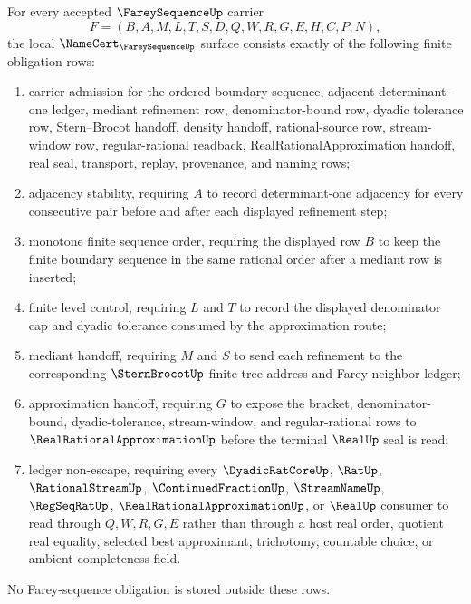 \begin{theorem}
\label{thm:farey-sequence-namecert-obligations}
For every accepted $\FareySequenceUp$ carrier
$$
F=(B,A,M,L,T,S,D,Q,W,R,G,E,H,C,P,N),
$$
the local $\NameCert_{\FareySequenceUp}$ surface consists exactly of the following finite obligation rows:
\begin{enumerate}
\item carrier admission for the ordered boundary sequence, adjacent determinant-one ledger, mediant refinement row, denominator-bound row, dyadic tolerance row, Stern--Brocot handoff, density handoff, rational-source row, stream-window row, regular-rational readback, RealRationalApproximation handoff, real seal, transport, replay, provenance, and naming rows;
\item adjacency stability, requiring $A$ to record determinant-one adjacency for every consecutive pair before and after each displayed refinement step;
\item monotone finite sequence order, requiring the displayed row $B$ to keep the finite boundary sequence in the same rational order after a mediant row is inserted;
\item finite level control, requiring $L$ and $T$ to record the displayed denominator cap and dyadic tolerance consumed by the approximation route;
\item mediant handoff, requiring $M$ and $S$ to send each refinement to the corresponding $\SternBrocotUp$ finite tree address and Farey-neighbor ledger;
\item approximation handoff, requiring $G$ to expose the bracket, denominator-bound, dyadic-tolerance, stream-window, and regular-rational rows to $\RealRationalApproximationUp$ before the terminal $\RealUp$ seal is read;
\item ledger non-escape, requiring every $\DyadicRatCoreUp$, $\RatUp$, $\RationalStreamUp$, $\ContinuedFractionUp$, $\StreamNameUp$, $\RegSeqRatUp$, $\RealRationalApproximationUp$, or $\RealUp$ consumer to read through $Q,W,R,G,E$ rather than through a host real order, quotient real equality, selected best approximant, trichotomy, countable choice, or ambient completeness field.
\end{enumerate}
No Farey-sequence obligation is stored outside these rows.
\end{theorem}
